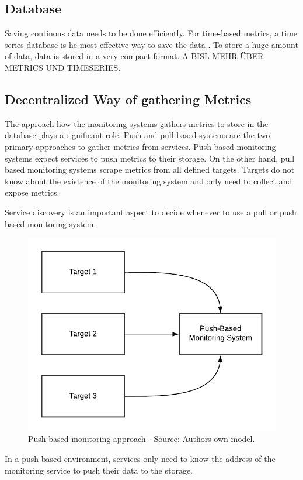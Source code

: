 \subsection{Database}
Saving continous data needs to be done efficiently. 
For time-based metrics, a time series database is he most effective way to save the data \cite{Farcic2017Toolkit21}. To store a huge amount of data, data is stored in a very compact format.
A BISL MEHR ÜBER METRICS UND TIMESERIES.


\subsection{Decentralized Way of gathering Metrics}
The approach how the monitoring systems gathers metrics to store in the database plays a significant role.
Push and pull based systems are the two primary approaches to gather metrics from services.
Push based monitoring systems expect services to push metrics to their storage.
On the other hand, pull based monitoring systems scrape metrics from all defined targets. Targets do not know about the existence of the monitoring system and only need to collect and expose metrics.


Service discovery is an important aspect to decide whenever to use a pull or push based monitoring system.

\begin{figure}[h]
\centering
\includegraphics[scale=0.8]{images/02_theoretical_foundation/monitoring/push_based}
\caption{Push-based monitoring approach - Source: Authors own model.}
\label{fig:mon_push-based}
\end{figure}
In a push-based environment, services only need to know the address of the monitoring service to push their data to the storage.


